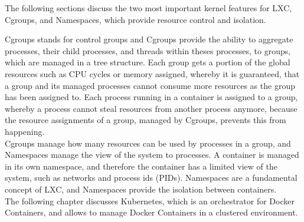 The following sections discuss the two most important kernel features for LXC, Cgroups, and Namespaces, which provide resource control and isolation. 

Cgroups stands for control groups and Cgroups provide the ability to aggregate processes, their child processes, and threads within theses processes, to groups, which are managed in a tree structure. Each group gets a portion of the global resources such as CPU cycles or memory assigned, whereby it is guaranteed, that a group and its managed processes cannot consume more resources as the group has been assigned to. Each process running in a container is assigned to a group, whereby a process cannot steal resources from another process anymore, because the resource assignments of a group, managed by Cgroups, prevents this from happening\cite{KernelCGroupsV12018, KernelCGroupV22015, IntelLXCHyperVisor2014}. \\

Cgroups manage how many resources can be used by processes in a group, and Namespaces manage the view of the system to processes. A container is managed in its own namespace, and therefore the container has a limited view of the system, such as networks and process ids (PIDs). Namespaces are a fundamental concept of LXC, and Namespaces provide the isolation between containers\cite{LinuxNamespaces2018, IntelLXCHyperVisor2014}. \\

The following chapter discusses Kubernetes, which is an orchestrator for Docker Containers, and allows to manage Docker Containers in a clustered environment. 
 

